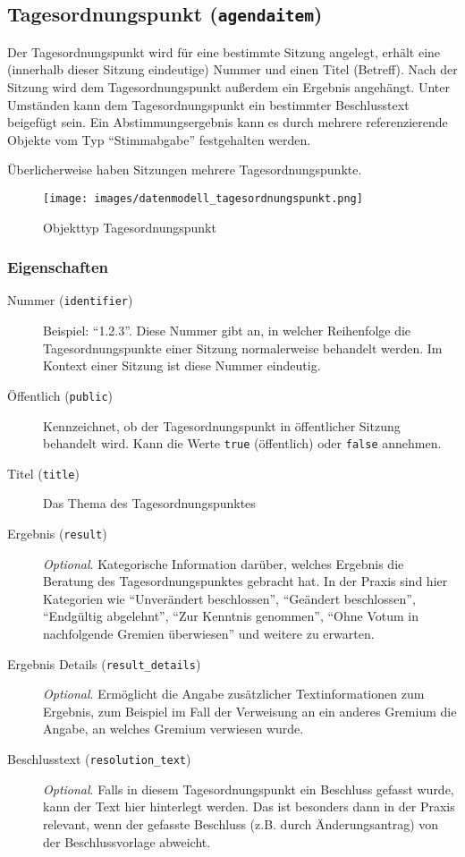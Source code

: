 \documentclass[,a4paper]{article}
\makeatletter
\def\maxwidth{\ifdim\Gin@nat@width>\linewidth\linewidth
\else\Gin@nat@width\fi}
\let\Oldincludegraphics\includegraphics
\renewcommand{\includegraphics}[1]{\Oldincludegraphics[width=\maxwidth]{#1}}
\makeatother
\begin{document}
\subsection{Tagesordnungspunkt (\texttt{agendaitem})}

Der Tagesordnungspunkt wird für eine bestimmte Sitzung angelegt, erhält
eine (innerhalb dieser Sitzung eindeutige) Nummer und einen Titel
(Betreff). Nach der Sitzung wird dem Tagesordnungspunkt außerdem ein
Ergebnis angehängt. Unter Umständen kann dem Tagesordnungspunkt ein
bestimmter Beschlusstext beigefügt sein. Ein Abstimmungsergebnis kann es
durch mehrere referenzierende Objekte vom Typ ``Stimmabgabe''
festgehalten werden.

Überlicherweise haben Sitzungen mehrere Tagesordnungspunkte.

\begin{figure}[htbp]
\centering
\texttt{[image: images/datenmodell\_tagesordnungspunkt.png]}
\caption{Objekttyp Tagesordnungspunkt}
\end{figure}

\subsubsection{Eigenschaften}

\begin{description}
\item[Nummer (\texttt{identifier})]
Beispiel: ``1.2.3''. Diese Nummer gibt an, in welcher Reihenfolge die
Tagesordnungspunkte einer Sitzung normalerweise behandelt werden. Im
Kontext einer Sitzung ist diese Nummer eindeutig.
\item[Öffentlich (\texttt{public})]
Kennzeichnet, ob der Tagesordnungspunkt in öffentlicher Sitzung
behandelt wird. Kann die Werte \texttt{true} (öffentlich) oder
\texttt{false} annehmen.
\item[Titel (\texttt{title})]
Das Thema des Tagesordnungspunktes
\item[Ergebnis (\texttt{result})]
\emph{Optional}. Kategorische Information darüber, welches Ergebnis die
Beratung des Tagesordnungspunktes gebracht hat. In der Praxis sind hier
Kategorien wie ``Unverändert beschlossen'', ``Geändert beschlossen'',
``Endgültig abgelehnt'', ``Zur Kenntnis genommen'', ``Ohne Votum in
nachfolgende Gremien überwiesen'' und weitere zu erwarten.
\item[Ergebnis Details (\texttt{result\_details})]
\emph{Optional}. Ermöglicht die Angabe zusätzlicher Textinformationen
zum Ergebnis, zum Beispiel im Fall der Verweisung an ein anderes Gremium
die Angabe, an welches Gremium verwiesen wurde.
\item[Beschlusstext (\texttt{resolution\_text})]
\emph{Optional}. Falls in diesem Tagesordnungspunkt ein Beschluss
gefasst wurde, kann der Text hier hinterlegt werden. Das ist besonders
dann in der Praxis relevant, wenn der gefasste Beschluss (z.B. durch
Änderungsantrag) von der Beschlussvorlage abweicht.
\end{description}
\end{document}
